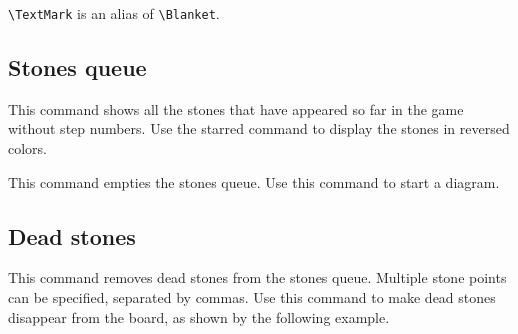 \documentclass[a4paper]{oblivoir}
\begin{document}
\verb|\TextMark| is an alias of \verb|\Blanket|.

\subsection{%
Stones queue}

\begin{boxedverbatim}
\KSBadukContinue
\end{boxedverbatim}

This command shows all the stones that have appeared so far in the game without step numbers. 
Use the starred command to display the stones in reversed colors.

\begin{boxedverbatim}
\ClearHistory
\end{boxedverbatim}

This command empties the stones queue.
Use this command to start a diagram.

\subsection{%
Dead stones}

\begin{boxedverbatim}
\end{boxedverbatim}
This command removes dead stones from the stones queue.
Multiple stone points can be specified, separated by commas.
Use this command to make dead stones disappear from the board, as shown by the following example.

\ClearHistory

\begin{boxedverbatim}
\begin{ksbadukpan}[badukpansize=6][D]
\end{ksbadukpan}
\begin{ksbadukpan}[badukpansize=6][D]
\KSBadukContinue
\end{ksbadukpan}
\end{boxedverbatim}

\begin{ksbadukpan}[badukpansize=6][D]
\end{ksbadukpan}
\hfill
\begin{ksbadukpan}[badukpansize=6][D]
\KSBadukContinue
\end{ksbadukpan}
\end{document}
